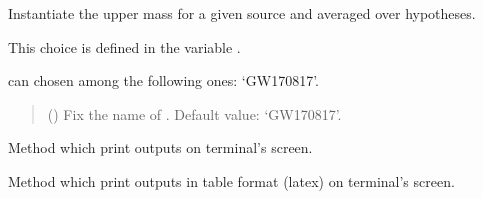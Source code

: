 \documentclass[letterpaper,10pt,english]{sphinxmanual}
\begin{document}

\begin{fulllineitems}
\label{\detokenize{source/api/setup_astro_mup:nucleardatapy.astro.setup_mup.setupMupAverage}}
\pysigstartsignatures
{}
\pysigstopsignatures
\sphinxAtStartPar
Instantiate the upper mass for a given source and averaged over hypotheses.

\sphinxAtStartPar
This choice is defined in the variable .

\sphinxAtStartPar
{} can chosen among the following ones: ‘GW170817’.
\begin{quote}\begin{description}
\sphinxAtStartPar
{} (\sphinxstyleliteralemphasis{\sphinxupquote{, }}) \textendash{} Fix the name of . Default value: ‘GW170817’.

\end{description}\end{quote}

\sphinxAtStartPar
{}

\begin{fulllineitems}
\label{\detokenize{source/api/setup_astro_mup:nucleardatapy.astro.setup_mup.setupMupAverage.print_output}}
\pysigstartsignatures
{}
\pysigstopsignatures
\sphinxAtStartPar
Method which print outputs on terminal’s screen.

\end{fulllineitems}


\begin{fulllineitems}
\label{\detokenize{source/api/setup_astro_mup:nucleardatapy.astro.setup_mup.setupMupAverage.print_table}}
\pysigstartsignatures
{}
\pysigstopsignatures
\sphinxAtStartPar
Method which print outputs in table format (latex) on terminal’s screen.

\end{fulllineitems}


\end{fulllineitems}
\end{document}
